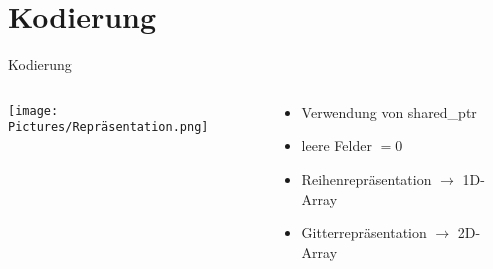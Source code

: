 \section{Kodierung}
\begin{frame}{Kodierung}
    \begin{columns}[T] %
        \begin{column}{0.75\textwidth}
            \texttt{[image: Pictures/Repräsentation.png]}
        \end{column}
        \begin{column}{0.35\textwidth}
            \begin{itemize}
                \item Verwendung von shared\_ptr
                \item leere Felder \(=0\)
                \item Reihenrepräsentation \(\rightarrow\) 1D-Array
                \item Gitterrepräsentation \(\rightarrow\) 2D-Array
            \end{itemize}
        \end{column}
    \end{columns}
\end{frame}
